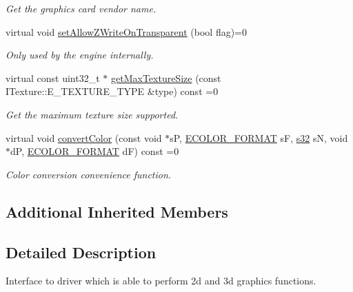 \begin{DoxyCompactItemize}
\begin{DoxyCompactList}\small\item\em Get the graphics card vendor name. \end{DoxyCompactList}\item 
virtual void \hyperlink{classirr_1_1video_1_1IVideoDriver_af78022589e5b7cb42b4d6ed2f7950e42}{set\+Allow\+Z\+Write\+On\+Transparent} (bool flag)=0
\begin{DoxyCompactList}\small\item\em Only used by the engine internally. \end{DoxyCompactList}\item 
virtual const uint32\+\_\+t $\ast$ \hyperlink{classirr_1_1video_1_1IVideoDriver_a006a7122fae833d18c7d2633c8c21780}{get\+Max\+Texture\+Size} (const I\+Texture\+::\+E\+\_\+\+T\+E\+X\+T\+U\+R\+E\+\_\+\+T\+Y\+PE \&type) const  =0\hypertarget{classirr_1_1video_1_1IVideoDriver_a006a7122fae833d18c7d2633c8c21780}{}\label{classirr_1_1video_1_1IVideoDriver_a006a7122fae833d18c7d2633c8c21780}

\begin{DoxyCompactList}\small\item\em Get the maximum texture size supported. \end{DoxyCompactList}\item 
virtual void \hyperlink{classirr_1_1video_1_1IVideoDriver_a3a66ae240bccdc514d699be87a4582e5}{convert\+Color} (const void $\ast$sP, \hyperlink{namespaceirr_1_1video_a1d5e487888c32b1674a8f75116d829ed}{E\+C\+O\+L\+O\+R\+\_\+\+F\+O\+R\+M\+AT} sF, \hyperlink{namespaceirr_ac66849b7a6ed16e30ebede579f9b47c6}{s32} sN, void $\ast$dP, \hyperlink{namespaceirr_1_1video_a1d5e487888c32b1674a8f75116d829ed}{E\+C\+O\+L\+O\+R\+\_\+\+F\+O\+R\+M\+AT} dF) const  =0
\begin{DoxyCompactList}\small\item\em Color conversion convenience function. \end{DoxyCompactList}\end{DoxyCompactItemize}
\subsection*{Additional Inherited Members}


\subsection{Detailed Description}
Interface to driver which is able to perform 2d and 3d graphics functions. 

